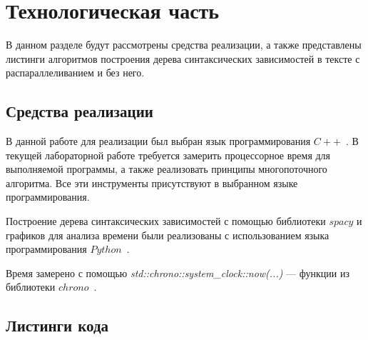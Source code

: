 \chapter{Технологическая часть}

В данном разделе будут рассмотрены средства реализации, а также представлены листинги алгоритмов построения дерева синтаксических зависимостей в тексте с распараллеливанием и без него.
\section{Средства реализации}
В данной работе для реализации был выбран язык программирования $C++$~\cite{cpp-lang}. В текущей лабораторной работе требуется замерить процессорное время для выполняемой программы, а также реализовать принципы многопоточного алгоритма. Все эти инструменты присутствуют в выбранном языке программирования. 

Построение дерева синтаксических зависимостей с помощью библиотеки $spacy$ и графиков для анализа времени были реализованы с использованием языка программирования $Python$~\cite{python-lang}.

Время замерено с помощью \textit{std::chrono::system\_clock::now(...)} --- функции из библиотеки $chrono$~\cite{cpp-lang-chrono}.
\section{Листинги кода}

